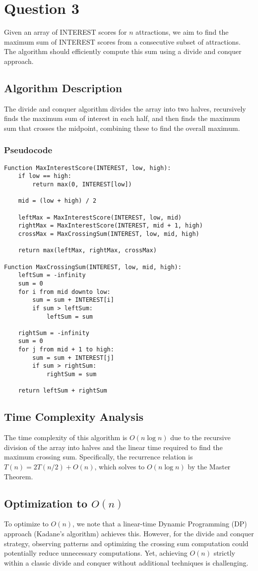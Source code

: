 \documentclass{article}
\begin{document}
\section{Question 3}

Given an array of INTEREST scores for $n$ attractions, we aim to find the maximum sum of INTEREST scores from a consecutive subset of attractions. The algorithm should efficiently compute this sum using a divide and conquer approach.

\subsection{Algorithm Description}
The divide and conquer algorithm divides the array into two halves, recursively finds the maximum sum of interest in each half, and then finds the maximum sum that crosses the midpoint, combining these to find the overall maximum.

\subsubsection{Pseudocode}
\begin{verbatim}
Function MaxInterestScore(INTEREST, low, high):
    if low == high:
        return max(0, INTEREST[low])

    mid = (low + high) / 2

    leftMax = MaxInterestScore(INTEREST, low, mid)
    rightMax = MaxInterestScore(INTEREST, mid + 1, high)
    crossMax = MaxCrossingSum(INTEREST, low, mid, high)

    return max(leftMax, rightMax, crossMax)

Function MaxCrossingSum(INTEREST, low, mid, high):
    leftSum = -infinity
    sum = 0
    for i from mid downto low:
        sum = sum + INTEREST[i]
        if sum > leftSum:
            leftSum = sum

    rightSum = -infinity
    sum = 0
    for j from mid + 1 to high:
        sum = sum + INTEREST[j]
        if sum > rightSum:
            rightSum = sum

    return leftSum + rightSum
\end{verbatim}

\subsection{Time Complexity Analysis}
The time complexity of this algorithm is $O(n \log n)$ due to the recursive division of the array into halves and the linear time required to find the maximum crossing sum. Specifically, the recurrence relation is $T(n) = 2T(n/2) + O(n)$, which solves to $O(n \log n)$ by the Master Theorem.

\subsection{Optimization to $O(n)$}
To optimize to $O(n)$, we note that a linear-time Dynamic Programming (DP) approach (Kadane's algorithm) achieves this. However, for the divide and conquer strategy, observing patterns and optimizing the crossing sum computation could potentially reduce unnecessary computations. Yet, achieving $O(n)$ strictly within a classic divide and conquer without additional techniques is challenging.
\end{document}
